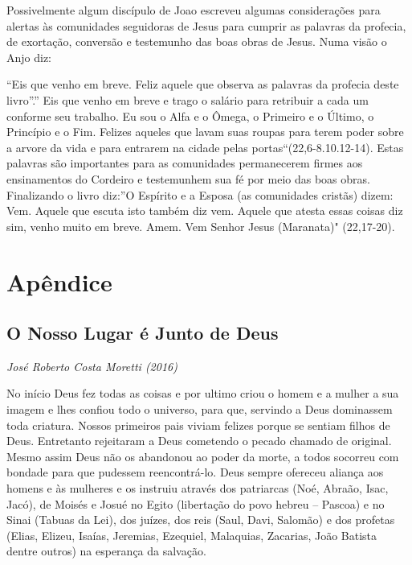 \documentclass[
]{book}
\begin{document}
Possivelmente algum discípulo de Joao escreveu algumas considerações para alertas às comunidades seguidoras de Jesus para cumprir as palavras da profecia, de exortação, conversão e testemunho das boas obras de Jesus. Numa visão o Anjo diz:

``Eis que venho em breve. Feliz aquele que observa as palavras da profecia deste livro''.'' Eis que venho em breve e trago o salário para retribuir a cada um conforme seu trabalho. Eu sou o Alfa e o Ômega, o Primeiro e o Último, o Princípio e o Fim. Felizes aqueles que lavam suas roupas para terem poder sobre a arvore da vida e para entrarem na cidade pelas portas``(22,6-8.10.12-14). Estas palavras são importantes para as comunidades permanecerem firmes aos ensinamentos do Cordeiro e testemunhem sua fé por meio das boas obras. Finalizando o livro diz:''O Espírito e a Esposa (as comunidades cristãs) dizem: Vem. Aquele que escuta isto também diz vem. Aquele que atesta essas coisas diz sim, venho muito em breve. Amem. Vem Senhor Jesus (Maranata)" (22,17-20).

\hypertarget{apuxeandice}{%
\chapter*{Apêndice}\label{apuxeandice}}

\hypertarget{o-nosso-lugar-uxe9-junto-de-deus}{%
\section*{O Nosso Lugar é Junto de Deus}\label{o-nosso-lugar-uxe9-junto-de-deus}}

\emph{José Roberto Costa Moretti (2016)}

No início Deus fez todas as coisas e por ultimo criou o homem e a mulher a sua imagem e lhes confiou todo o universo, para que, servindo a Deus dominassem toda criatura. Nossos primeiros pais viviam felizes porque se sentiam filhos de Deus. Entretanto rejeitaram a Deus cometendo o pecado chamado de original. Mesmo assim Deus não os abandonou ao poder da morte, a todos socorreu com bondade para que pudessem reencontrá-lo. Deus sempre ofereceu aliança aos homens e às mulheres e os instruiu através dos patriarcas (Noé, Abraão, Isac, Jacó), de Moisés e Josué no Egito (libertação do povo hebreu -- Pascoa) e no Sinai (Tabuas da Lei), dos juízes, dos reis (Saul, Davi, Salomão) e dos profetas (Elias, Elizeu, Isaías, Jeremias, Ezequiel, Malaquias, Zacarias, João Batista dentre outros) na esperança da salvação.
\end{document}
